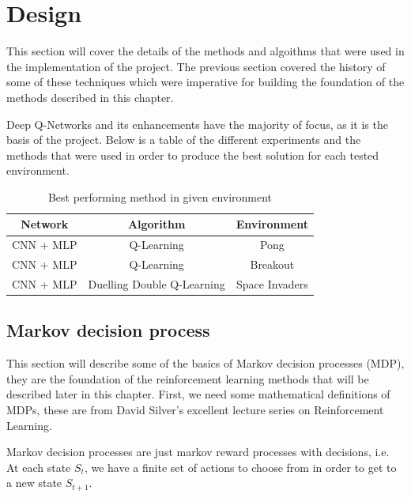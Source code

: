 \chapter{Design}
This section will cover the details of the methods and algoithms that were used in the implementation of the project. The previous section covered the history of some of these techniques which were imperative for building the foundation of the methods described in this chapter.

Deep Q-Networks and its enhancements have the majority of focus, as it is the basis of the project. Below is a table of the different experiments and the methods that were used in order to produce the best solution for each tested environment.

\begin{table}[h!]
	\begin{center}
		\begin{tabular}{|c|c|c|}
			\hline
			Network   & Algorithm                  & Environment    \\
			\hline
			CNN + MLP & Q-Learning                 & Pong           \\
			CNN + MLP & Q-Learning                 & Breakout       \\
			CNN + MLP & Duelling Double Q-Learning & Space Invaders \\
			\hline
		\end{tabular}
		\caption{Best performing method in given environment}\label{table:design:algo-experiment}
	\end{center}
\end{table}

\section{Markov decision process}
\label{dsgn:sec:mdp}
This section will describe some of the basics of Markov decision processes (MDP), they are the foundation of the reinforcement learning methods that will be described later in this chapter. First, we need some mathematical definitions of MDPs, these are from David Silver's excellent lecture series on Reinforcement Learning.

Markov decision processes are just markov reward processes with decisions, i.e. At each state $S_t$, we have a finite set of actions to choose from in order to get to a new state $S_{t+1}$.

